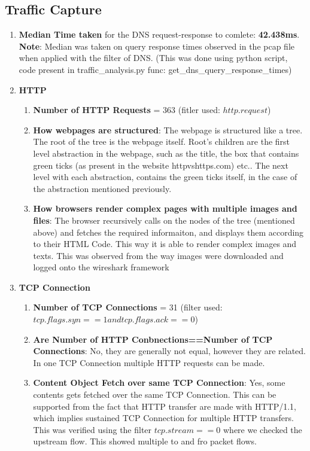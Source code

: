\documentclass[12pt]{article}
\begin{document}
\subsection{Traffic Capture}
\renewcommand{\labelenumi}{\Alph{enumi}}
\begin{enumerate}
    \item \textbf{Median Time taken} for the DNS request-response to comlete: \textbf{42.438ms}. \textbf{Note}: Median was taken on query response times observed in the pcap file when applied with the filter of DNS. (This was done using python script, code present in traffic\_analysis.py func: get\_dns\_query\_response\_times)
    \item \textbf{HTTP}
    \begin{enumerate}
        \item \textbf{Number of HTTP Requests} = 363 (fitler used: $http.request$)
        \item \textbf{How webpages are structured}: The webpage is structured like a tree. The root of the tree is the webpage itself. Root's children are the first level abstraction in the webpage, such as the title, the box that contains green ticks (as present in the website httpvshttps.com) etc.. The next level with each abstraction, contains the green ticks itself, in the case of the abstraction mentioned previously. 
        \item \textbf{How browsers render complex pages with multiple images and files}: The browser recursively calls on the nodes of the tree (mentioned above) and fetches the required informaiton, and displays them according to their HTML Code. This way it is able to render complex images and texts. This was observed from the way images were downloaded and logged onto the wireshark framework
    \end{enumerate}
    \item \textbf{TCP Connection}
    \begin{enumerate}
        \item \textbf{Number of TCP Connections} = 31 (filter used: $tcp.flags.syn == 1 and tcp.flags.ack == 0$)
        \item \textbf{Are Number of HTTP Conbnections==Number of TCP Connections}: No, they are generally not equal, however they are related. In one TCP Connection multiple HTTP requests can be made.
        \item \textbf{Content Object Fetch over same TCP Connection}: Yes, some contents gets fetched over the same TCP Connection. This can be supported from the fact that HTTP transfer are made with HTTP/1.1, which implies sustained TCP Connection for multiple HTTP transfers. This was verified using the filter $tcp.stream == 0$ where we checked the upstream flow. This showed multiple to and fro packet flows.

\end{enumerate}
\end{enumerate}
\end{document}
